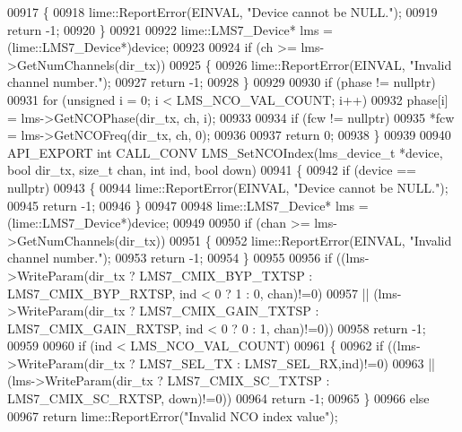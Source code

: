 \begin{DoxyCode}
00917     \{
00918         lime::ReportError(EINVAL, \textcolor{stringliteral}{"Device cannot be NULL."});
00919         \textcolor{keywordflow}{return} -1;
00920     \}
00921 
00922     lime::LMS7_Device* lms = (lime::LMS7_Device*)device;
00923 
00924     \textcolor{keywordflow}{if} (ch >= lms->GetNumChannels(dir\_tx))
00925     \{
00926         lime::ReportError(EINVAL, \textcolor{stringliteral}{"Invalid channel number."});
00927         \textcolor{keywordflow}{return} -1;
00928     \}
00929 
00930     \textcolor{keywordflow}{if} (phase != \textcolor{keyword}{nullptr})
00931         \textcolor{keywordflow}{for} (\textcolor{keywordtype}{unsigned} i = 0; i < LMS_NCO_VAL_COUNT; i++)
00932             phase[i] = lms->GetNCOPhase(dir\_tx, ch, i);
00933 
00934     \textcolor{keywordflow}{if} (fcw != \textcolor{keyword}{nullptr})
00935         *fcw = lms->GetNCOFreq(dir\_tx, ch, 0);
00936 
00937     \textcolor{keywordflow}{return} 0;
00938 \}
00939 
00940 API_EXPORT \textcolor{keywordtype}{int} CALL_CONV LMS_SetNCOIndex(lms_device_t *device, \textcolor{keywordtype}{bool} dir_tx, \textcolor{keywordtype}{size\_t} 
      chan, \textcolor{keywordtype}{int} ind, \textcolor{keywordtype}{bool} down)
00941 \{
00942     \textcolor{keywordflow}{if} (device == \textcolor{keyword}{nullptr})
00943     \{
00944         lime::ReportError(EINVAL, \textcolor{stringliteral}{"Device cannot be NULL."});
00945         \textcolor{keywordflow}{return} -1;
00946     \}
00947 
00948     lime::LMS7_Device* lms = (lime::LMS7_Device*)device;
00949 
00950     \textcolor{keywordflow}{if} (chan >= lms->GetNumChannels(dir\_tx))
00951     \{
00952         lime::ReportError(EINVAL, \textcolor{stringliteral}{"Invalid channel number."});
00953         \textcolor{keywordflow}{return} -1;
00954     \}
00955 
00956     \textcolor{keywordflow}{if} ((lms->WriteParam(dir\_tx ? LMS7_CMIX_BYP_TXTSP : LMS7_CMIX_BYP_RXTSP, ind < 0 ? 1 : 0, chan)!=0)
00957     || (lms->WriteParam(dir\_tx ? LMS7_CMIX_GAIN_TXTSP : LMS7_CMIX_GAIN_RXTSP, ind < 0 ? 0 : 1, chan)!=0))
00958         \textcolor{keywordflow}{return} -1;
00959 
00960     \textcolor{keywordflow}{if} (ind < LMS_NCO_VAL_COUNT)
00961     \{
00962             \textcolor{keywordflow}{if} ((lms->WriteParam(dir\_tx ? LMS7_SEL_TX : LMS7_SEL_RX,ind)!=0)
00963             || (lms->WriteParam(dir\_tx ? LMS7_CMIX_SC_TXTSP : LMS7_CMIX_SC_RXTSP, down)!=0))
00964                 \textcolor{keywordflow}{return} -1;
00965     \}
00966     \textcolor{keywordflow}{else}
00967         \textcolor{keywordflow}{return} lime::ReportError(\textcolor{stringliteral}{"Invalid NCO index value"});

\end{DoxyCode}
